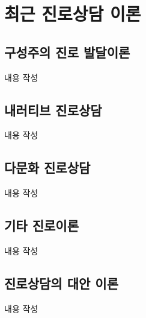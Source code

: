 \section{최근 진로상담 이론}

\subsection{구성주의 진로 발달이론}
내용 작성

\subsection{내러티브 진로상담}
내용 작성

\subsection{다문화 진로상담}
내용 작성

\subsection{기타 진로이론}
내용 작성

\subsection{진로상담의 대안 이론}
내용 작성
